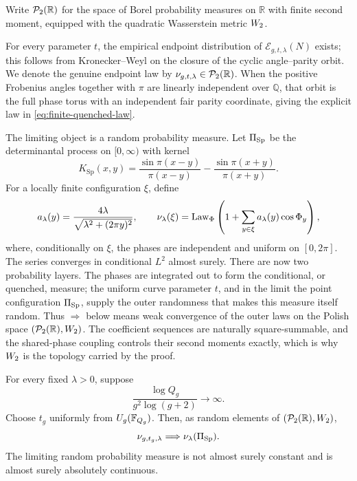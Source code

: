 Write \(\mathcal P_2(\mathbb R)\) for the space of Borel probability measures on \(\mathbb R\)
with finite second moment, equipped with the quadratic Wasserstein metric
\(W_2\).

For every parameter \(t\), the empirical endpoint distribution of
\(\mathcal E_{g,t,\lambda}(N)\) exists; this follows from
Kronecker--Weyl on the closure of the cyclic angle--parity orbit.  We denote
the genuine endpoint law by \(\nu_{g,t,\lambda}\in\mathcal P_2(\mathbb R)\).  When the positive
Frobenius angles together with \(\pi\) are linearly independent over
\(\mathbb Q\), that orbit is the full phase torus with an independent fair
parity coordinate, giving the explicit law in \eqref{eq:finite-quenched-law}.

The limiting object is a random probability measure.  Let \(\Pi_{\mathrm{Sp}}\) be the
determinantal process on \([0,\infty)\) with kernel
\begin{equation}
 K_{\mathrm{Sp}}(x,y)
 =\frac{\sin\pi(x-y)}{\pi(x-y)}
  -\frac{\sin\pi(x+y)}{\pi(x+y)}.
\label{eq:sp-kernel}
\end{equation}
For a locally finite configuration \(\xi\), define
\begin{equation}
 a_\lambda(y)=\frac{4\lambda}
 {\sqrt{\lambda^2+(2\pi y)^2}},\qquad
 \nu_\lambda(\xi)
 =\operatorname{Law}_\Phi\left(1+\sum_{y\in\xi}a_\lambda(y)\cos\Phi_y\right),
\label{eq:quenched-limit-law}
\end{equation}
where, conditionally on \(\xi\), the phases are independent and uniform on
\([0,2\pi]\).  The series converges in conditional \(L^2\) almost surely.
There are now two probability layers.  The phases are integrated out to form
the conditional, or quenched, measure; the uniform curve parameter \(t\), and
in the limit the point configuration \(\Pi_{\mathrm{Sp}}\), supply the outer randomness
that makes this measure itself random.  Thus \(\Longrightarrow\) below means
weak convergence of the outer laws on the Polish space \((\mathcal P_2(\mathbb R),W_2)\).
The coefficient sequences are naturally square-summable, and the shared-phase
coupling controls their second moments exactly, which is why \(W_2\) is the
topology carried by the proof.

\begin{theorem}
\label{thm:main}
For every fixed \(\lambda>0\), suppose
\begin{equation}
 \frac{\log Q_g}{g^2\log(g+2)}\longrightarrow\infty.
\label{eq:growth}
\end{equation}
Choose \(t_g\) uniformly from \(U_g(\mathbb F_{Q_g})\).  Then, as random elements of
\((\mathcal P_2(\mathbb R),W_2)\),
\begin{equation}
 \nu_{g,t_g,\lambda}\Longrightarrow\nu_\lambda(\Pi_{\mathrm{Sp}}).
\label{eq:main-convergence}
\end{equation}
The limiting random probability measure is not almost surely constant and is
almost surely absolutely continuous.
\end{theorem}

